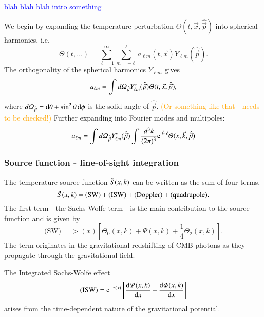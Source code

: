\textcolor{blue}{blah blah blah intro something}


We begin by expanding the temperature perturbation $\Theta(t, \vec{x}, \hat{\vec{p}})$ into spherical harmonics,
i.e.
\begin{equation}
    \Theta(t, \dots) = \sum_{\ell=1}^{\infty} \sum_{m=-\ell}^{\ell} a_{\ell m}(t, \vec{x}) Y_{\ell m} (\hat{\vec{p}}).
\end{equation}
The orthogonality of the spherical harmonics $Y_{\ell m}$ gives
\begin{equation}
    a_{\ell m} = \int \dOmg[p] Y^*_{\ell m} (\hat{\vec{p}}) \Theta(t, \vec{x}, \hat{\vec{p}}),
\end{equation}
where $d\varOmega_{\hat{\vec{p}}} = \diff \theta + \sin^2{\theta}\diff \phi$ is the solid angle of $\hat{\vec{p}}$. \textcolor{orange}{(Or something like that---needs to be checked!)} Further expanding into Fourier modes and multipoles:
\begin{equation}
\begin{split}
    a_{\ell m} = \int \dOmg[p] Y^*_{\ell m} (\hat{\vec{p}}) \int \frac{d^3 k}{(2\pi)^3} \eu[\im \vec{k}\cdot \vec{x}] \Theta(x, \vec{k}, \hat{\vec{p}}) 
\end{split}
\end{equation}


\subsubsection{Source function - line-of-sight integration}
    The temperature source function $\St(x,k)$ can be written as the sum of four terms,
    \begin{equation}\label{mil4:theo:eq:source_function_four_terms}
        \St(x,k) = \text{(SW)} + \text{(ISW)} + \text{(Doppler)} + \text{(quadrupole)}.
    \end{equation}
    The first term---the Sachs-Wolfe term---is the main contribution to the source function and is given by
    \begin{equation}
        \text{(SW)} = \gt(x) \left[\Theta_0(x,k) + \Psi(x,k) + \frac{1}{4}\Theta_2(x,k) \right].
    \end{equation}
    The term originates in the gravitational redshifting of CMB photons as they propagate through the gravitational field.

    The Integrated Sachs-Wolfe effect %
    \begin{equation}
        \text{(ISW)} = \eu[-\tau(x)] \left[ \dv{\Psi(x,k)}{x}-  \dv{\Phi(x,k)}{x} \right]
    \end{equation}
    arises from the time-dependent nature of the gravitational potential.

